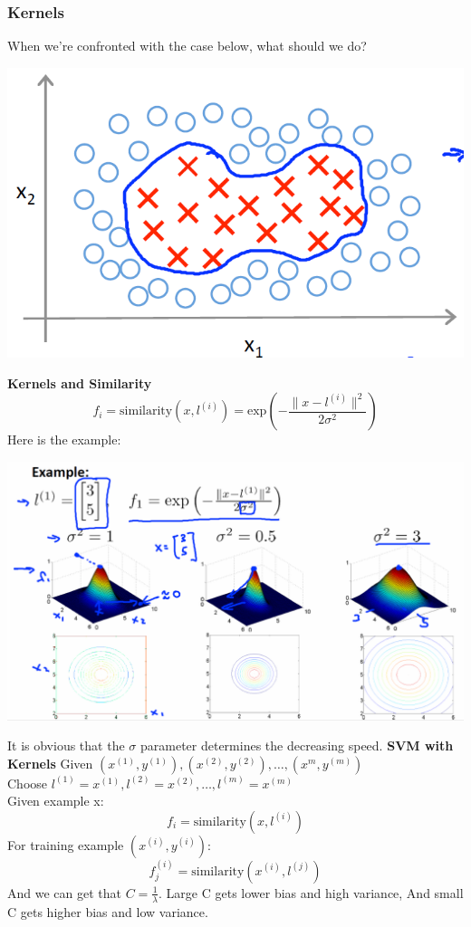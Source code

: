 \documentclass{article}
\begin{document}
\subsubsection{Kernels}
When we're confronted with the case below, what should we do?
\begin{center}
\includegraphics[scale=0.4]{7.png}
\end{center}
\textbf{Kernels and Similarity}
\[f_i = \text{similarity}(x,l^{(i)}) = \text{exp$(-\frac{\|x-l^{(i)}\|^2}{2\sigma^2})$}\]
Here is the example:
\begin{center}
\includegraphics[scale=0.4]{8.png}
\end{center}
It is obvious that the $\sigma$ parameter determines the decreasing speed.
\textbf{SVM with Kernels}
Given $(x^{(1)},y^{(1)}),(x^{(2)},y^{(2)}),\ldots,(x^{m},y^{(m)})$\\
Choose $l^{(1)}=x^{(1)},l^{(2)}=x^{(2)},\ldots,l^{(m)}=x^{(m)}$\\
Given example x:
\[f_i = \text{similarity}(x,l^{(i)})\]
For training example $(x^{(i)},y^{(i)})$:
\[f_j^{(i)} = \text{similarity}(x^{(i)},l^{(j)})\]
And we can get that $C=\frac{1}{\lambda}$. Large C gets lower bias and high variance, And small C gets higher bias and low variance.
\end{document}
